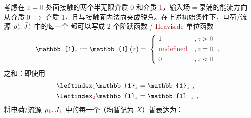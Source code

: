 考虑在 $\mathcolor{gray}{z} = \mathcolor{gray}{0}$ 处面接触的两个半无限介质 \textcolor{Maroon}{0} 和介质 \textcolor{Maroon}{1}，输入场$=$泵浦的能流方向从介质 \textcolor{Maroon}{0} $\to$ 介质 \textcolor{Maroon}{1}，且与接触面内法向夹成锐角。在上述初始条件下，电荷/流源 ${\rho}^{\;\!\mathcolor{gray}{t}}_{\;\!\mathcolor{gray}{z}}, \bar{J}^{\;\!\mathcolor{gray}{t}}_{\;\!\mathcolor{gray}{z}}$ 中的每一个 都可以写成 2 个阶跃函数 / \textcolor{Maroon}{Heaviside} 单位函数
\begin{align} \label{eq:u}
	\mathbb{1}_{\mathcolor{gray}{z}} := \mathbb{1} \left( \mathcolor{gray}{z} \right) = ~\left\{~ \begin{aligned} 
		&1 &&, \mathcolor{gray}{z \mathcolor{black}{>} 0} \\ 
		&\textcolor{Maroon}{\text{undefined}} &&, \mathcolor{gray}{z \mathcolor{black}{=} 0} \\
		&0 &&, \mathcolor{gray}{z \mathcolor{black}{<} 0} \end{aligned}\right. ~,
\end{align}
之和：即使用
\begin{subequations} \label{eq:u-01}
	\abovedisplayskip=0pt
\begin{align}
	\leftindex_{\textcolor{Maroon}{1}} {\mathbb{1}}_{\mathcolor{gray}{z}} &= {\mathbb{1}}_{\mathcolor{gray}{z}} ~, \label{eq:u-1} \\ 
	\leftindex_{\textcolor{Maroon}{0}} {\mathbb{1}}_{\mathcolor{gray}{z}} &= {\mathbb{1}}_{ - \mathcolor{gray}{z} } ~, \label{eq:u-0}
\end{align}
\end{subequations}
将电荷/流源 $\rho_{\;\!\textcolor{Maroon}{\text{b}}}, J_{\;\!\textcolor{Maroon}{\text{b}}}$ 中的每一个（均暂记为 $X$）暂表达为：
\abovedisplayskip=8pt
